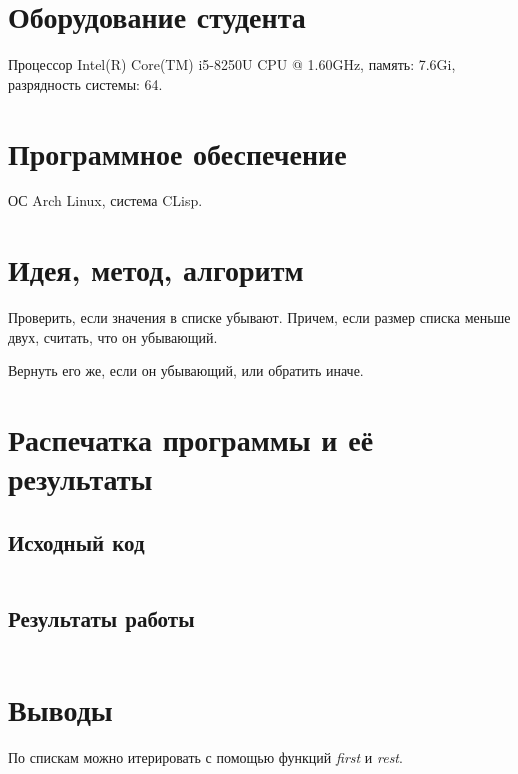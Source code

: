 \documentclass[12pt]{article}
\begin{document}
\section{Оборудование студента}
Процессор Intel(R) Core(TM) i5-8250U CPU @ 1.60GHz, память: 7.6Gi, разрядность системы: 64.

\section{Программное обеспечение}
ОС Arch Linux, система CLisp.

\section{Идея, метод, алгоритм}

Проверить, если значения в списке убывают. Причем, если размер списка меньше двух, считать,
что он убывающий.

Вернуть его же, если он убывающий, или обратить иначе.


\section{Распечатка программы и её результаты}

\subsection{Исходный код}
\inputminted[linenos, frame=lines]{lisp}{./descend-reverse.lisp}

\subsection{Результаты работы}
\inputminted[frame=lines]{lisp}{./log.lisp}



\section{Выводы}
По спискам можно итерировать с помощью функций \textit{first} и \textit{rest}.
\end{document}
